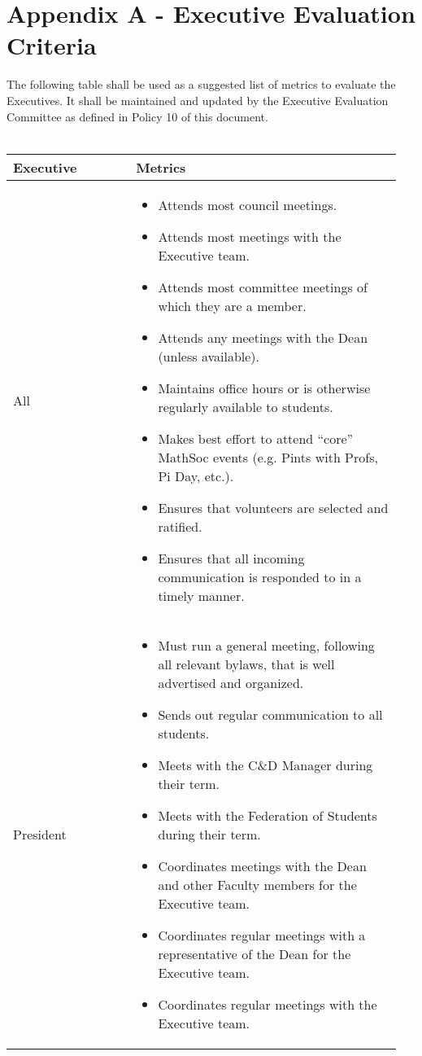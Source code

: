 \section{Appendix A - Executive Evaluation Criteria}

The following table shall be used as a suggested list of metrics to evaluate the Executives. It shall be maintained and updated by the Executive Evaluation Committee as defined in Policy 10 of this document.\\
\\
\begin{longtable}{p{0.3\linewidth} p{0.65\linewidth}}
\toprule
Executive & Metrics\\
\midrule
All &
\begin{itemize}
\item Attends most council meetings.
\item Attends most meetings with the Executive team.
\item Attends most committee meetings of which they are a member.
\item Attends any meetings with the Dean (unless available).
\item Maintains office hours or is otherwise regularly available to students.
\item Makes best effort to attend “core” MathSoc events (e.g. Pints with Profs, Pi Day, etc.).
\item Ensures that volunteers are selected and ratified.
\item Ensures that all incoming communication is responded to in a timely manner.
\end{itemize}
\\
\midrule
President &
\begin{itemize}
\item Must run a general meeting, following all relevant bylaws, that is well advertised and organized.
\item Sends out regular communication to all students.
\item Meets with the C\&D Manager during their term.
\item Meets with the Federation of Students during their term.
\item Coordinates meetings with the Dean and other Faculty members for
the Executive team.
\item Coordinates regular meetings with a representative of the Dean for the
Executive team.
\item Coordinates regular meetings with the Executive team.

\end{itemize}
\end{longtable}
